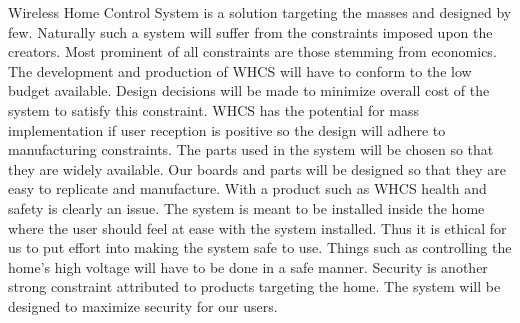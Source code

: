 Wireless Home Control System is a solution targeting the masses and designed by
few. Naturally such a system will suffer from the constraints imposed upon the
creators. Most prominent of all constraints are those stemming from economics.
The development and production of WHCS will have to conform to the low budget
available. Design decisions will be made to minimize overall cost of the system
to satisfy this constraint. WHCS has the potential for mass implementation if
user reception is positive so the design will adhere to manufacturing
constraints. The parts used in the system will be chosen so that they are
widely available. Our boards and parts will be designed so that they are easy
to replicate and manufacture. With a product such as WHCS health and safety is
clearly an issue. The system is meant to be installed inside the home where the
user should feel at ease with the system installed. Thus it is ethical for us to
put effort into making the system safe to use. Things such as controlling the
home{}'s high voltage will have to be done in a safe manner. Security is
another strong constraint attributed to products targeting the home. The system
will be designed to maximize security for our users.
